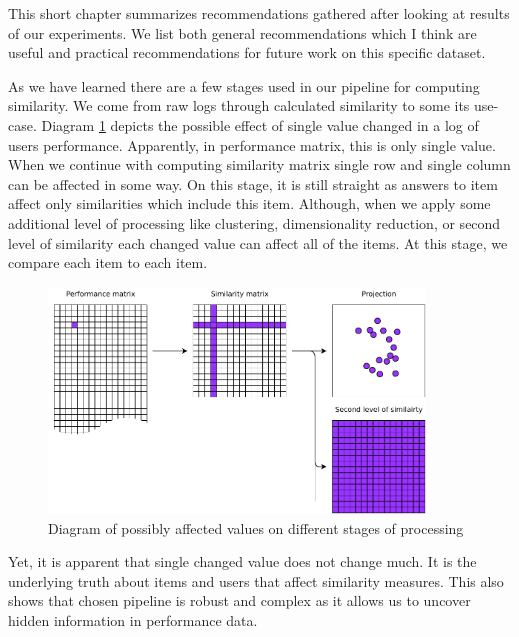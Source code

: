 \documentclass[
  digital, %
  table,   %
  nolof,     %
  nolot,     %
  nocover,
  color,
  final, %
]{fithesis3}
\begin{document}


This short chapter summarizes recommendations gathered after looking at results of our experiments. We list both general recommendations which I think are useful and practical recommendations for future work on this specific dataset.


As we have learned there are a few stages used in our pipeline for computing similarity. We come from raw logs through calculated similarity to some its use-case. Diagram \ref{fig:affected_diagram} depicts the possible effect of single value changed in a log of users performance. Apparently, in performance matrix, this is only single value. When we continue with computing similarity matrix single row and single column can be affected in some way. On this stage, it is still straight as answers to item affect only similarities which include this item. Although, when we apply some additional level of processing like clustering, dimensionality reduction, or second level of similarity each changed value can affect all of the items. At this stage, we compare each item to each item.

\begin{figure}
  \includegraphics[width=10cm]{img/affected_diagram}
  \caption{Diagram of possibly affected values on different stages of processing}
  \label{fig:affected_diagram}
\end{figure}

Yet, it is apparent that single changed value does not change much. It is the underlying truth about items and users that affect similarity measures. This also shows that chosen pipeline is robust and complex as it allows us to uncover hidden information in performance data.
\end{document}
